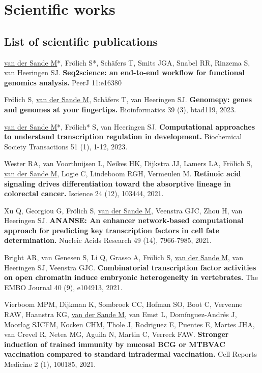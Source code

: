 \section{Scientific works}

\subsection{List of scientific publications}

\noindent
\underline{van der Sande M}*, Frölich S*, Schäfers T, Smits JGA, Snabel RR, Rinzema S, van Heeringen SJ. \textbf{Seq2science: an end-to-end workflow for functional genomics analysis.} PeerJ 11:e16380 \cite{seq2science}
\newline

\noindent
Frölich S, \underline{van der Sande M}, Schäfers T, van Heeringen SJ. \textbf{Genomepy: genes and genomes at your fingertips.} Bioinformatics 39 (3), btad119, 2023. \cite{Frlich2023}
\newline

\noindent
\underline{van der Sande M}*, Frölich* S, van Heeringen SJ. \textbf{Computational approaches to understand transcription regulation in development.} Biochemical Society Transactions 51 (1), 1-12, 2023. \cite{vanderSande2023}
\newline

\noindent
Wester RA, van Voorthuijsen L, Neikes HK, Dijkstra JJ, Lamers LA, Frölich S, \underline{van der Sande M}, Logie C, Lindeboom RGH, Vermeulen M. \textbf{Retinoic acid signaling drives differentiation toward the absorptive lineage in colorectal cancer.} Iscience 24 (12), 103444, 2021. \cite{Wester2021}
\newline

\noindent
Xu Q, Georgiou G, Frölich S, \underline{van der Sande M}, Veenstra GJC, Zhou H, van Heeringen SJ. \textbf{ANANSE: An enhancer network-based computational approach for predicting key transcription factors in cell fate determination.} Nucleic Acids Research 49 (14), 7966-7985, 2021. \cite{Xu_2020}
\newline

\noindent
Bright AR, van Genesen S, Li Q, Grasso A, Frölich S, \underline{van der Sande M}, van Heeringen SJ, Veenstra GJC.
\textbf{Combinatorial transcription factor activities on open chromatin induce embryonic heterogeneity in vertebrates.} The EMBO Journal 40 (9), e104913, 2021. \cite{Bright_2021}
\newline

\noindent
Vierboom MPM, Dijkman K, Sombroek CC, Hofman SO, Boot C, Vervenne RAW, Haanstra KG, \underline{van der Sande M}, van Emst L, Domínguez-Andrés J, Moorlag SJCFM, Kocken CHM, Thole J, Rodriguez E, Puentes E, Martes JHA, van Crevel R, Netea MG, Aguila N, Martin C, Verreck FAW. \textbf{Stronger induction of trained immunity by mucosal BCG or MTBVAC vaccination compared to standard intradermal vaccination.} Cell Reports Medicine 2 (1), 100185, 2021. \cite{Vierboom2021}
\newline

